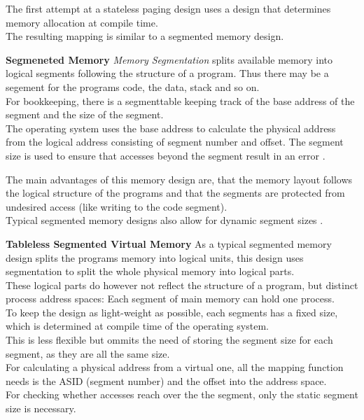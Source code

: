 The first attempt at a stateless  paging design
uses a design that determines memory allocation at compile time.\\
The resulting mapping is similar to a segmented memory design.

\textbf{Segmeneted Memory}
\textit{Memory Segmentation} splits available memory into logical segments following the structure of a program. Thus there may be a segement for the programs code, the data, stack and so on.\\
For bookkeeping, there is a segmenttable keeping track of the base address of the segment
and the size of the segment.\\
The operating system uses the base address to calculate the physical address from the logical
address consisting of segment number and offset. The segment size is used to ensure that
accesses beyond the segment result in an error \cite{tanenbaumOS}.

The main advantages of this memory design are, that the memory layout follows the logical structure of the programs and that the segments are protected from undesired access (like writing to the code segment).\\
Typical segmented memory designs also allow for dynamic segment sizes \cite{tanenbaumOS}.



\textbf{Tableless Segmented Virtual Memory}
As a typical segmented memory design splits the programs memory into logical units, this design uses segmentation to split the whole physical memory into logical parts.\\
These logical parts do however not reflect the structure of a program, but distinct process address spaces: Each segment of main memory can hold one process.\\
To keep the design as light-weight as possible, each segments has a fixed size, which is determined at compile time of the operating system.\\
This is less flexible but ommits the need of storing the segment size for each segment, as they are all the same size.\\
For calculating a physical address from a virtual one, all the mapping function needs is the ASID (segment number) and the offset into the address space.\\
For checking whether accesses reach over the the segment, only the static segment size is necessary.

